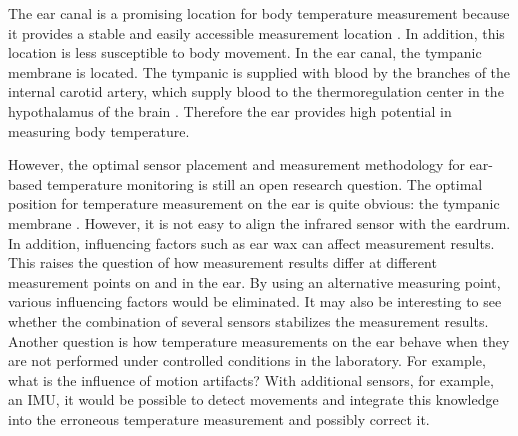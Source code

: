 The ear canal is a promising location for body temperature measurement because it provides a stable and easily accessible measurement location \cite{ericksonComparisonEarbasedBladder1993}.
In addition, this location is less susceptible to body movement. 
In the ear canal, the tympanic membrane is located.
The tympanic is supplied with blood by the branches of the internal carotid artery, which supply blood to the thermoregulation center in the hypothalamus of the brain \cite{moranCoreTemperatureMeasurement2002a}.
Therefore the ear provides high potential in measuring body temperature.

However, the optimal sensor placement and measurement methodology for ear-based temperature monitoring is still an open research question. 
The optimal position for temperature measurement on the ear is quite obvious: the tympanic membrane \cite{childsTympanicMembraneTemperature1999, kimComparisonBilateralEardrum2022, mumaComparisonRectalAxillary1991}.
However, it is not easy to align the infrared sensor with the eardrum. In addition, influencing factors such as ear wax can affect measurement results. 
This raises the question of how measurement results differ at different measurement points on and in the ear. 
By using an alternative measuring point, various influencing factors would be eliminated.
It may also be interesting to see whether the combination of several sensors stabilizes the measurement results.
Another question is how temperature measurements on the ear behave when they are not performed under controlled conditions in the laboratory.
For example, what is the influence of motion artifacts?
With additional sensors, for example, an IMU, it would be possible to detect movements and integrate this knowledge into the erroneous temperature measurement and possibly correct it.

